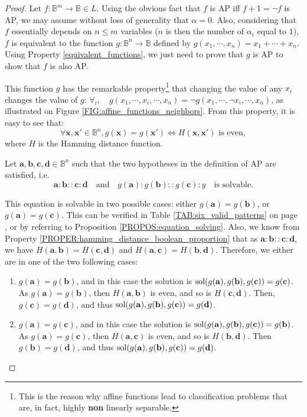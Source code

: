 \begin{proof}
  Let $f \colon \mathbb{B}^m \to \mathbb{B} \in L$. Using the obvious fact that
  $f$ is AP  iff $f + 1 = \neg f$ is AP, we may assume without loss of
  generality that $\alpha = 0$. Also, considering that $f$ essentially depends
  on $n \leq m$ variables ($n$ is then the number of $\alpha_i$ equal to $1$),
  $f$ is equivalent to the function $g \colon \mathbb{B}^n \to \mathbb{B}$
  defined by $g(x_1, \cdots, x_n) = x_1 +  \cdots + x_n$. Using Property
  \ref{equivalent_functions}, we just need to prove that $g$ is AP to show that
  $f$ is also AP.

  This function $g$ has the remarkable property\footnote{This is the reason why
  affine functions lead to classification problems that are, in fact, highly
  \textbf{non} linearly separable.} that changing the value of any $x_i$
  changes the value of $g$: $\forall _i, \quad g(x_1, \cdots, x_i, \cdots, x_n)
  = \neg g(x_1, \cdots, \neg x_i, \cdots, x_n)$, as illustrated on Figure
  \ref{FIG:affine_functions_neighbors}. From this property, it is easy to see
  that:
  $$\forall \mathbf{x}, \mathbf{x}' \in \mathbb{B}^n, g(\mathbf{x}) =
  g(\mathbf{x}') \iff H(\mathbf{x}, \mathbf{x}') \text{ is even},$$
  where $H$ is the Hamming distance function.

  Let $\mathbf{a}, \mathbf{b}, \mathbf{c}, \mathbf{d} \in \mathbb{B}^n$  such
  that the two hypotheses in the definition of AP are satisfied, i.e.
  $$
  \mathbf{a} : \mathbf{b} :: \mathbf{c} : \mathbf{d}\quad \text{and}\quad
  g(\mathbf{a}) : g(\mathbf{b}) :: g(\mathbf{c}) : y\quad  \text{is  solvable}.
  $$

  This equation is solvable in two possible cases: either $g(\mathbf{a}) =
  g(\mathbf{b})$, or $g(\mathbf{a}) = g(\mathbf{c})$. This can be verified in
  Table \ref{TAB:six_valid_patterns} on page \pageref{TAB:six_valid_patterns},
  or by referring to Proposition \ref{PROPOS:equation_solving}.
  Also, we know from Property \ref{PROPER:hamming_distance_boolean_proportion}
  that as $\mathbf{a} : \mathbf{b} :: \mathbf{c} : \mathbf{d}$, we have
  $H(\mathbf{a}, \mathbf{b}) = H(\mathbf{c}, \mathbf{d})$ and $H(\mathbf{a},
  \mathbf{c}) = H(\mathbf{b}, \mathbf{d})$.
  Therefore, we either are in one of the two following cases:
  \begin{enumerate}
    \item $g(\mathbf{a}) = g(\mathbf{b})$, and in this case the solution is
      $\text{sol}(g(\mathbf{a}), g(\mathbf{b}), g(\mathbf{c})) = g(\mathbf{c})$. As
      $g(\mathbf{a}) = g(\mathbf{b})$, then $H(\mathbf{a}, \mathbf{b})$ is
      even, and so is $H(\mathbf{c}, \mathbf{d})$. Then, $g(\mathbf{c}) =
      g(\mathbf{d})$, and thus $\text{sol}(g(\mathbf{a}), g(\mathbf{b}),
      g(\mathbf{c})) = g(\mathbf{d})$.
    \item $g(\mathbf{a}) = g(\mathbf{c})$, and in this case the solution is
      $\text{sol}(g(\mathbf{a}), g(\mathbf{b}), g(\mathbf{c})) = g(\mathbf{b})$. As
      $g(\mathbf{a}) = g(\mathbf{c})$, then $H(\mathbf{a}, \mathbf{c})$ is
      even, and so is $H(\mathbf{b}, \mathbf{d})$. Then $g(\mathbf{b}) =
      g(\mathbf{d})$, and thus $\text{sol}(g(\mathbf{a}), g(\mathbf{b}),
      g(\mathbf{c})) = g(\mathbf{d})$.
  \end{enumerate}


\end{proof}
